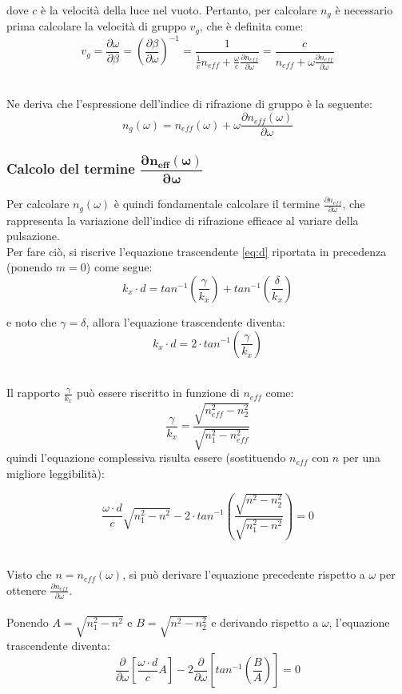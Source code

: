 \noindent dove $c$ è la velocità della luce nel vuoto. Pertanto, per calcolare $n_g$ è necessario prima calcolare
la velocità di gruppo $v_g$, che è definita come:
\begin{equation}
    v_g = \frac{\partial\omega}{\partial\beta} = \left(\frac{\partial\beta}{\partial\omega}\right)^{-1} = \frac{1}{\frac{1}{c} n_{eff} + \frac{\omega}{c}\frac{\partial n_{eff}}{\partial \omega}} = \frac{c}{n_{eff} + \omega\frac{\partial n_{eff}}{\partial \omega}}
\end{equation}

\noindent\\ Ne deriva che l'espressione dell'indice di rifrazione di gruppo è la seguente:
\begin{equation}
    n_g(\omega) = n_{eff}(\omega) + \omega\frac{\partial n_{eff}(\omega)}{\partial \omega}
\end{equation}

\noindent
\subsubsection*{Calcolo del termine $\boldsymbol{\dfrac{\partial n_{eff}(\omega)}{\partial \omega}}$}

\noindent Per calcolare $n_g(\omega)$ è quindi fondamentale calcolare il termine $\frac{\partial n_{eff}}{\partial \omega}$, che rappresenta la variazione dell'indice di rifrazione efficace al variare della pulsazione.\\
Per fare ciò, si riscrive l'equazione trascendente \ref{eq:d} riportata in precedenza (ponendo $m = 0$) come segue:
\[
    k_x \cdot d = tan^{-1}\left(\frac{\gamma}{k_x}\right) + tan^{-1}\left(\frac{\delta}{k_x}\right)
\]

\noindent e noto che $\gamma = \delta$, allora l'equazione trascendente diventa:
\[
    k_x \cdot d = 2 \cdot tan^{-1}\left(\frac{\gamma}{k_x}\right)
\]

\noindent\\ Il rapporto $\frac{\gamma}{k_x}$ può essere riscritto in funzione di $n_{eff}$ come: 
\[
\frac{\gamma}{k_x} = \frac{\sqrt{n_{eff}^2 - n_2^2}}{\sqrt{n_1^2 - n_{eff}^2}}
\]
\noindent quindi l'equazione complessiva risulta essere (sostituendo $n_{eff}$ con $n$ per una migliore leggibilità):

\[
    \frac{\omega \cdot d}{c} \sqrt{n_1^2 - n^2} - 2 \cdot tan^{-1}\left(\frac{\sqrt{n^2 - n_2^2}}{\sqrt{n_1^2 - n^2}}\right) = 0
\]

\noindent\\ Visto che $n = n_{eff}(\omega)$, si può derivare l'equazione precedente rispetto a $\omega$ per ottenere $\frac{\partial n_{eff}}{\partial \omega}$.\\
\\Ponendo $A = \sqrt{n_1^2 - n^2}$ e $B = \sqrt{n^2 - n_2^2}$ e derivando rispetto a $\omega$, l'equazione trascendente diventa:
\[
    \frac{\partial}{\partial \omega} \left[\frac{\omega \cdot d}{c} A\right] - 2 \frac{\partial}{\partial \omega} \left[tan^{-1}\left(\frac{B}{A}\right)\right] = 0
\]

